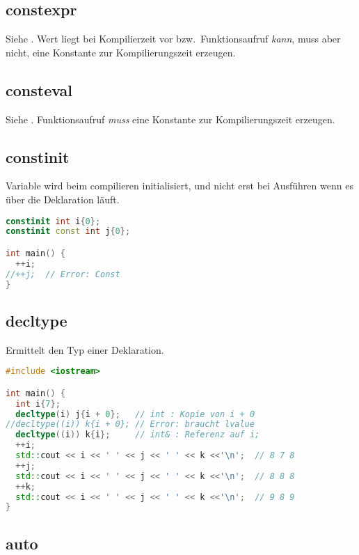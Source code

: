 \subsection{constexpr}

Siehe . Wert liegt bei Kompilierzeit vor bzw.\
Funktionsaufruf \emph{kann}, muss aber nicht, eine Konstante zur
Kompilierungszeit erzeugen.

\subsection{consteval}

Siehe . Funktionsaufruf \emph{muss} eine Konstante zur Kompilierungszeit erzeugen.

\subsection{constinit}

Variable wird beim compilieren initialisiert, und nicht erst bei Ausführen wenn
es über die Deklaration läuft.

\begin{lstlisting}[language=C++]
constinit int i{0};
constinit const int j{0};

int main() {
  ++i;
//++j;  // Error: Const
}
\end{lstlisting}

\subsection{decltype}

Ermittelt den Typ einer Deklaration.

\begin{lstlisting}[language=C++]
#include <iostream>

int main() {
  int i{7};
  decltype(i) j{i + 0};   // int : Kopie von i + 0
//decltype((i)) k{i + 0}; // Error: braucht lvalue
  decltype((i)) k{i};     // int& : Referenz auf i;
  ++i;
  std::cout << i << ' ' << j << ' ' << k <<'\n';  // 8 7 8
  ++j;
  std::cout << i << ' ' << j << ' ' << k <<'\n';  // 8 8 8
  ++k;
  std::cout << i << ' ' << j << ' ' << k <<'\n';  // 9 8 9
}
\end{lstlisting}

\subsection{auto}

